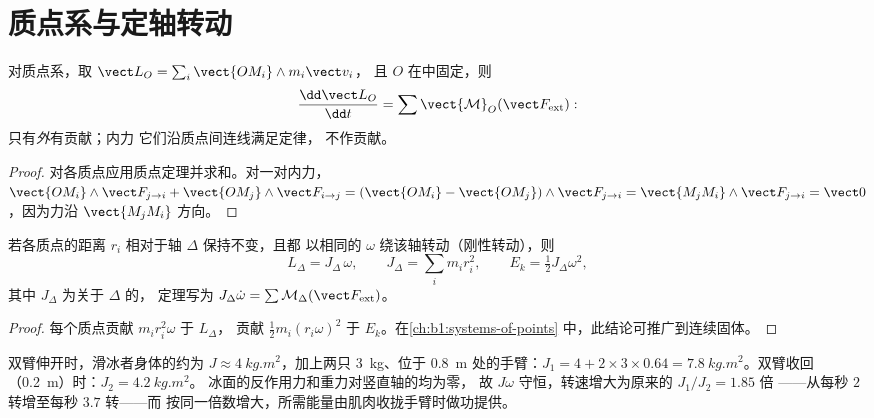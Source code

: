 \section{质点系与定轴转动}

\begin{theorem}[质点系的角动量]\label{thm:b1:angular-momentum:system}
对质点系，取 $\vect L_O = \sum_i\vect{OM_i}\wedge m_i\vect v_i$，
且 $O$ 在中固定，则
\[
\frac{\dd\vect L_O}{\dd t} = \sum\vect{\mathcal M}_O(\vect F_{\mathrm{ext}}):
\]
只有\emph{外}有贡献；内力
它们沿质点间连线满足定律，
不作贡献。
\end{theorem}

\begin{proof}
对各质点应用质点定理并求和。对一对内力，$\vect{OM_i}\wedge\vect F_{j\to i}
+ \vect{OM_j}\wedge\vect F_{i\to j} = (\vect{OM_i} - \vect{OM_j})\wedge\vect F_{j\to i}
= \vect{M_jM_i}\wedge\vect F_{j\to i} = \vect 0$，因为力沿
$\vect{M_jM_i}$ 方向。
\end{proof}

\begin{proposition}[刚性定轴转动]\label{prop:b1:angular-momentum:inertia}
若各质点的距离 $r_i$ 相对于轴 $\Delta$ 保持不变，且都
以相同的 $\omega$ 绕该轴转动（刚性转动），则
\[
L_\Delta = J_\Delta\,\omega, \qquad J_\Delta = \sum_i m_ir_i^2, \qquad
E_k = \tfrac12 J_\Delta\omega^2,
\]
其中 $J_\Delta$ 为关于 $\Delta$ 的\emph{}，
定理写为 $J_\Delta\dot\omega = \sum\mathcal M_\Delta(\vect F_{\mathrm{ext}})$。
\end{proposition}

\begin{proof}
每个质点贡献 $m_ir_i^2\omega$ 于 $L_\Delta$，
贡献 $\tfrac12 m_i(r_i\omega)^2$ 于 $E_k$。在\cref{ch:b1:systems-of-points}
中，此结论可推广到连续固体。
\end{proof}

\begin{example}[滑冰者]\label{ex:b1:angular-momentum:skater}
双臂伸开时，滑冰者身体的约为 $J \approx \qty{4}{kg.m^2}$，加上两只
\qty{3}{kg}、位于 \qty{0.8}{m} 处的手臂：$J_1 = 4 + 2 \times 3 \times 0.64 =
\qty{7.8}{kg.m^2}$。双臂收回（\qty{0.2}{m}）时：$J_2 = \qty{4.2}{kg.m^2}$。
冰面的反作用力和重力对竖直轴的均为零，
故 $J\omega$ 守恒，转速增大为原来的 $J_1/J_2 = 1.85$ 倍
——从每秒 $2$ 转增至每秒 $3.7$ 转——而
按同一倍数增大，所需能量由肌肉收拢手臂时做功提供。
\end{example}

